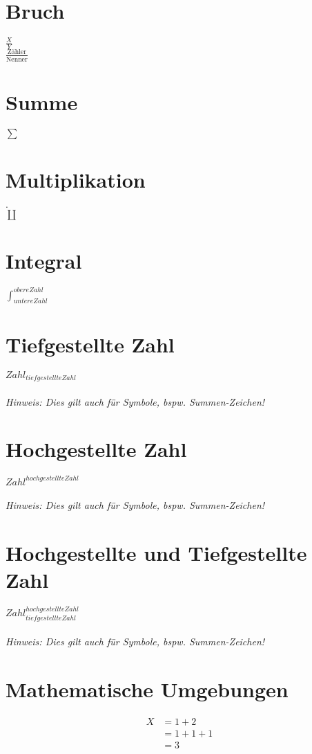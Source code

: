 \documentclass{scrarticle}
\begin{document}
	\Large
	\section{Bruch}
	$\frac{X}{Y}$ \\
	$\frac{\text{Zähler}}{\text{Nenner}}$
	\section{Summe}
	$\sum$
	\section{Multiplikation}
	$\cdot$ \\
	$\coprod$
	\section{Integral}
	$\int_{untere Zahl}^{obere Zahl}$
	\section{Tiefgestellte Zahl}
	$Zahl_{tiefgestellte Zahl}$
	\\\\\textit{Hinweis: Dies gilt auch für Symbole, bspw. Summen-Zeichen!}
	\section{Hochgestellte Zahl}
	$Zahl^{hochgestellte Zahl}$
	\\\\\textit{Hinweis: Dies gilt auch für Symbole, bspw. Summen-Zeichen!}
	\section{Hochgestellte und Tiefgestellte Zahl}
	$Zahl^{hochgestellte Zahl}_{tiefgestellte Zahl}$
	\\\\\textit{Hinweis: Dies gilt auch für Symbole, bspw. Summen-Zeichen!}
	
	\newpage
	
	\section{Mathematische Umgebungen}
	\begin{equation} \label{eq1}
		\begin{split}
			 X 	&= 1 + 2\\
				&= 1 + 1 + 1 \\
				&= 3
		\end{split}
	\end{equation}
\end{document}
